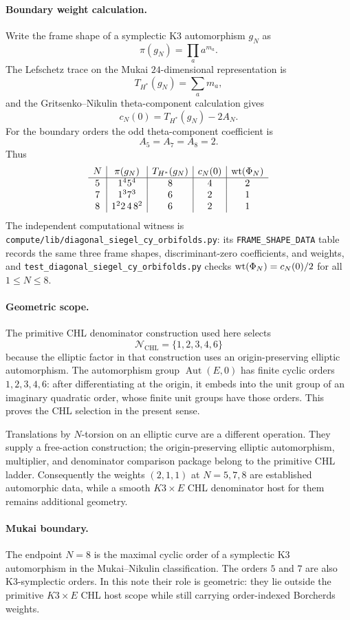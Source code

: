 \paragraph{Boundary weight calculation.}
Write the frame shape of a symplectic K3 automorphism \(g_N\) as
\[
  \pi(g_N)=\prod_a a^{m_a}.
\]
The Lefschetz trace on the Mukai \(24\)-dimensional representation is
\[
  T_{H^\ast}(g_N)=\sum_a m_a,
\]
and the Gritsenko--Nikulin theta-component calculation gives
\[
  c_N(0)=T_{H^\ast}(g_N)-2A_N.
\]
For the boundary orders the odd theta-component coefficient is
\[
  A_5=A_7=A_8=2.
\]
Thus
\[
\begin{array}{c|c|c|c|c}
N & \pi(g_N) & T_{H^\ast}(g_N) & c_N(0) & \operatorname{wt}(\Phi_N) \\ \hline
5 & 1^4 5^4 & 8 & 4 & 2 \\
7 & 1^3 7^3 & 6 & 2 & 1 \\
8 & 1^2 2\,4\,8^2 & 6 & 2 & 1
\end{array}
\]
The independent computational witness is
\texttt{compute/lib/diagonal\_siegel\_cy\_orbifolds.py}: its
\texttt{FRAME\_SHAPE\_DATA} table records the same three frame shapes,
discriminant-zero coefficients, and weights, and
\texttt{test\_diagonal\_siegel\_cy\_orbifolds.py} checks
\(\operatorname{wt}(\Phi_N)=c_N(0)/2\) for all \(1\leq N\leq 8\).

\paragraph{Geometric scope.}
The primitive CHL denominator construction used here selects
\[
  \mathcal N_{\mathrm{CHL}}=\{1,2,3,4,6\}
\]
because the elliptic factor in that construction uses an
origin-preserving elliptic automorphism.  The automorphism group
\(\operatorname{Aut}(E,0)\) has finite cyclic orders \(1,2,3,4,6\):
after differentiating at the origin, it embeds into the unit group of
an imaginary quadratic order, whose finite unit groups have those
orders.  This proves the CHL selection in the present sense.

Translations by \(N\)-torsion on an elliptic curve are a different
operation.  They supply a free-action construction; the
origin-preserving elliptic automorphism, multiplier, and denominator
comparison package belong to the primitive CHL ladder.  Consequently
the weights \((2,1,1)\) at \(N=5,7,8\) are established automorphic
data, while a smooth \(K3\times E\) CHL denominator host for them
remains additional geometry.

\paragraph{Mukai boundary.}
The endpoint \(N=8\) is the maximal cyclic order of a symplectic K3
automorphism in the Mukai--Nikulin classification.  The orders \(5\) and
\(7\) are also K3-symplectic orders.  In this note their role is
geometric: they lie outside the primitive \(K3\times E\) CHL host
scope while still carrying order-indexed Borcherds weights.

